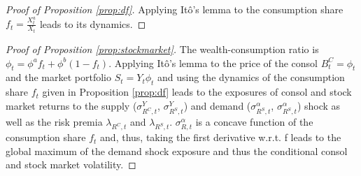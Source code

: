 \documentclass[preprint,11pt,authoryear]{elsarticle}
\theoremstyle{plain}
\begin{document}
 \begin{proof}[Proof of Proposition \ref{prop:df}]
 Applying It\^o's lemma to the consumption share $f_t = \frac{X^a_t}{X_t}$ leads to its dynamics.
 \end{proof}
\begin{proof}[Proof of Proposition \ref{prop:stockmarket}]
 The wealth-consumption ratio is $\phi_t = \phi^{a} f_t + \phi^{b} (1-f_t)$. Applying It\^o's lemma to the price of the consol $B_t^C=\phi_t$ and the market portfolio $S_t = Y_t \phi_t$ and using the dynamics of the consumption share $f_t$ given in Proposition \ref{prop:df} leads to the exposures of consol and stock market returns to the supply ($\sigma_{R^C,t}^Y$, $\sigma_{R^S,t}^Y$) and demand ($\sigma_{R^S,t}^{\alpha}$, $\sigma_{R^S,t}^{\alpha}$) shock as well as the risk premia $\lambda_{R^C,t}$ and $\lambda_{R^S,t}$. $\sigma_{R,t}^{\alpha}$ is a concave function of the consumption share $f_t$ and, thus, taking the first derivative w.r.t. f leads to the global maximum of the demand shock exposure and thus the conditional consol and stock market volatility.   
\end{proof}

 
 
\end{document}
